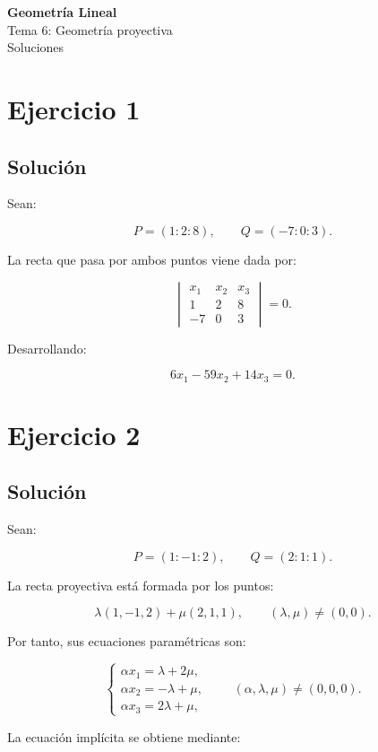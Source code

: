 \documentclass[11pt,a4paper]{article}
\begin{document}
\begin{center}
{\LARGE\bfseries Geometría Lineal}\\[0.4em]
{\Large Tema 6: Geometría proyectiva}\\[0.4em]
{\large Soluciones}
\end{center}

\section{Ejercicio 1}
\subsection{Solución}

Sean:

\[
P=(1:2:8),
\qquad
Q=(-7:0:3).
\]

La recta que pasa por ambos puntos viene dada por:

\[
\begin{vmatrix}
x_1&x_2&x_3\\
1&2&8\\
-7&0&3
\end{vmatrix}
=0.
\]

Desarrollando:

\[
\boxed{
6x_1-59x_2+14x_3=0.
}
\]

\section{Ejercicio 2}
\subsection{Solución}

Sean:

\[
P=(1:-1:2),
\qquad
Q=(2:1:1).
\]

La recta proyectiva está formada por los puntos:

\[
\lambda(1,-1,2)+\mu(2,1,1),
\qquad
(\lambda,\mu)\neq(0,0).
\]

Por tanto, sus ecuaciones paramétricas son:

\[
\boxed{
\begin{cases}
\alpha x_1=\lambda+2\mu,\\
\alpha x_2=-\lambda+\mu,\\
\alpha x_3=2\lambda+\mu,
\end{cases}
\qquad
(\alpha,\lambda,\mu)\neq(0,0,0).
}
\]

La ecuación implícita se obtiene mediante:
\end{document}
